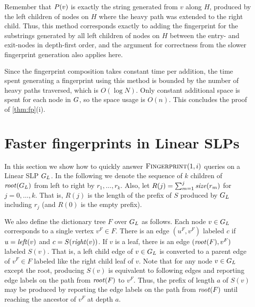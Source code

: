 Remember that $P(v)$ is exactly the string generated from $v$ along $H$, produced by the left children of nodes on $H$ where the heavy path was extended to the right child. Thus, this method corresponds exactly to adding the fingerprint for the substrings generated by all left children of nodes on $H$ between the entry- and exit-nodes in depth-first order, and the argument for correctness from the slower fingerprint generation also applies here.

Since the fingerprint composition takes constant time per addition, the time spent generating a fingerprint using this method is bounded by the number of heavy paths traversed, which is $O(\log N)$. Only constant additional space is spent for each node in $G$, so the space usage is $O(n)$. This concludes the proof of \autoref{thm:fp}(i).

\section{Faster fingerprints in Linear SLPs}
In this section we show how to quickly answer $\textsc{Fingerprint}(1, i)$ queries on a Linear SLP $G_L$. In the following we denote the sequence of $k$ children of $\mathit{root}(G_L)$ from left to right by $r_1, \ldots, r_k$. Also, let $R(j) = \sum_{m=1}^j \mathit{size}(r_m)$ for $j = 0, \ldots, k$. That is, $R(j)$ is the length of the prefix of $S$ produced by $G_L$ including $r_j$ (and $R(0)$ is the empty prefix).

We also define the dictionary tree $F$ over $G_L$ as follows. Each node $v \in G_L$ corresponds to a single vertex $v^F \in F$. There is an edge $(u^F, v^F)$ labeled $c$ if $u = \mathit{left}(v)$ and $c = S(\mathit{right}(v))$. If $v$ is a leaf, there is an edge $(\mathit{root}(F), v^F)$ labeled $S(v)$. That is, a left child edge of $v \in G_L$ is converted to a parent edge of $v^F \in F$ labeled like the right child leaf of $v$. Note that for any node $v \in G_L$ except the root, producing $S(v)$ is equivalent to following edges and reporting edge labels on the path from $\mathit{root}(F)$ to $v^F$. Thus, the prefix of length $a$ of $S(v)$ may be produced by reporting the edge labels on the path from $\mathit{root}(F)$ until reaching the ancestor of $v^F$ at depth $a$.


